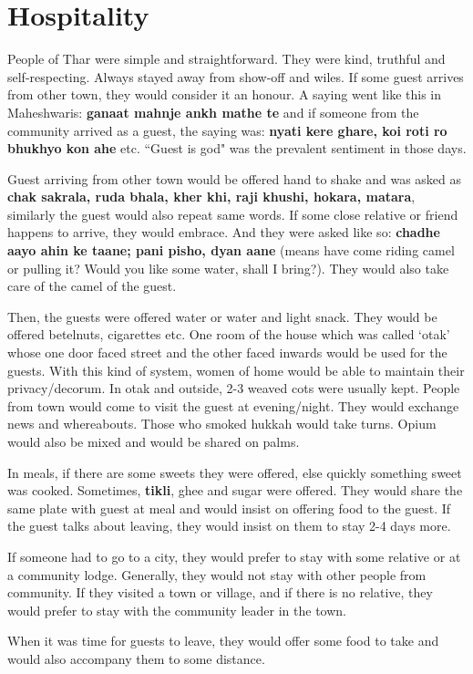 \chapter{Hospitality}
People of Thar were simple and straightforward. They were kind, truthful
and self-respecting. Always stayed away from show-off and wiles. If some guest
arrives from other town, they would consider it an honour. A saying went like
this in Maheshwaris: \textbf{ganaat mahnje ankh mathe te} and if someone from
the community arrived as a guest, the saying was: \textbf{nyati kere ghare, koi
roti ro bhukhyo kon ahe} etc. ``Guest is god" was the prevalent sentiment in
those days.

Guest arriving from other town would be offered hand to shake and was asked as
\textbf{chak sakrala, ruda bhala, kher khi, raji khushi, hokara, matara},
similarly the guest would also repeat same words. If some close relative or
friend happens to arrive, they would embrace. And they were asked like so:
\textbf{chadhe aayo ahin ke taane; pani pisho, dyan aane} (means have come
riding camel or pulling it? Would you like some water, shall I bring?). They
would also take care of the camel of the guest.

Then, the guests were offered water or water and light snack. They would be
offered betelnuts, cigarettes etc. One room of the house which was called
`otak' whose one door faced street and the other faced inwards would be used
for the guests. With this kind of system, women of home would be able to
maintain their privacy/decorum. In otak and outside, 2-3 weaved cots were
usually kept. People from town would come to visit the guest at evening/night.
They would exchange news and whereabouts. Those who smoked hukkah would take
turns. Opium would also be mixed and would be shared on palms.

In meals, if there are some sweets they were offered, else quickly something
sweet was cooked. Sometimes, \textbf{tikli}, ghee and sugar were offered. They
would share the same plate with guest at meal and would insist on offering food
to the guest. If the guest talks about leaving, they would insist on them to
stay 2-4 days more.

If someone had to go to a city, they would prefer to stay with some relative or
at a community lodge. Generally, they would not stay with other people from
community. If they visited a town or village, and if there is no relative, they
would prefer to stay with the community leader in the town.

When it was time for guests to leave, they would offer some food to take and
would also accompany them to some distance.
